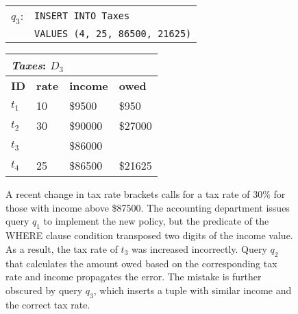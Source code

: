 \begin{figure*}[t]
\begin{minipage}[t]{0.43\textwidth}
\begin{tabular}{|p{1ex}l|}
            $q_3$: & \texttt{\small INSERT INTO Taxes}\\ 
                   & \texttt{\small VALUES (4, 25, 86500, 21625)}\\
            \hline
        \end{tabular}
    \end{minipage}
    \begin{minipage}[t]{0.28\textwidth}
         \vspace{0pt} 
         \centering
        \begin{tabular}{llll}
            \multicolumn{4}{l}{\emph{Taxes}: $D_3$}\\
            \toprule
            \textbf{ID}  & \textbf{rate}  & \textbf{income}    & \textbf{owed}\\
            \midrule
            $t_1$   & 10    & \$9500    & \$950\\
            $t_2$   & 30    & \$90000   & \$27000\\
            \rowcolor{mid-gray}
            $t_3$   & \color{red}{30}    & \$86000   & \color{red}{\$25800}\\
            $t_4$   & 25    & \$86500   & \$21625\\
            \bottomrule
        \end{tabular}
    \end{minipage}

    \caption{A recent change in tax rate brackets calls for a tax rate of 30\% for those with income above \$87500.  The accounting department issues query $q_1$ to implement the new policy, but the predicate of the WHERE clause condition transposed two digits of the income value.  As a result, the tax rate of $t_3$ was increased incorrectly.  Query $q_2$ that calculates the amount owed based on the corresponding tax rate and income propagates the error.  The mistake is further obscured by query $q_3$, which inserts a tuple with similar income and the correct tax rate.}
    \label{fig:example}
\end{figure*}